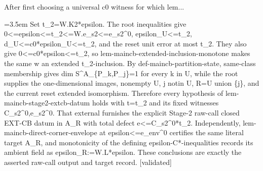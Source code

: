 \documentclass{article}
\newcommand{\step}[1]{\par\noindent\hangindent=3.5em\hangafter=1%
  \makebox[3.5em][l]{\textbf{#1.}}}
\newcommand{\steptag}[1]{\hfill{\small\textsf{[#1]}}}
\begin{document}
\begin{proofbox}{After first choosing a universal c0 witness for which lem...}
\step{1.7} Set t\_2=W.K2*epsilon. The root inequalities give 0<=epsilon<=t\_2<=W.e\_s2<=e\_s2\textasciicircum{}0, epsilon\_U<=t\_2, d\_U<=c0*epsilon\_U<=t\_2, and the reset unit error at most t\_2. They also give 0<=c0*epsilon<=t\_2, so lem-maincb-extended-inclusion-monotone makes the same w an extended t\_2-inclusion. By def-maincb-partition-state, same-class membership gives dim S\textasciicircum{}A\_\{P\_k,P\_j\}=1 for every k in U, while the root supplies the one-dimensional images, nonempty U, j notin U, R=U union \{j\}, and the current reset extended isomorphism. Therefore every hypothesis of lem-maincb-stage2-extcb-datum holds with t=t\_2 and its fixed witnesses C\_s2\textasciicircum{}0,e\_s2\textasciicircum{}0. That external furnishes the explicit Stage-2 raw-call closed EXT-CB datum in A\_R with total defect e<=C\_s2\textasciicircum{}0*t\_2. Independently, lem-maincb-direct-corner-envelope at epsilon<=e\_env\textasciicircum{}0 certifies the same literal target A\_R, and monotonicity of the defining epsilon-C*-inequalities records its ambient field as epsilon\_R:=W.L*epsilon. These conclusions are exactly the asserted raw-call output and target record. \steptag{validated} \\[4pt]
\end{proofbox}
\end{document}
